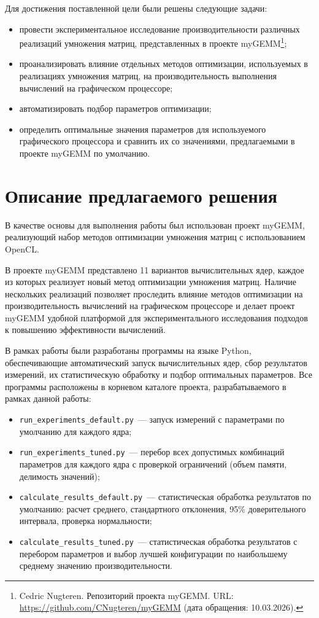 \documentclass[a4paper]{article}
\begin{document}
Для достижения поставленной цели были решены следующие задачи:
\begin{itemize}
\item провести экспериментальное исследование производительности различных реализаций умножения матриц, представленных в проекте myGEMM\footnote{Cedric Nugteren. Репозиторий проекта myGEMM. URL: \url{https://github.com/CNugteren/myGEMM} (дата обращения: 10.03.2026).};
\item проанализировать влияние отдельных методов оптимизации, используемых в реализациях умножения матриц, на производительность выполнения вычислений на графическом процессоре;
\item автоматизировать подбор параметров оптимизации;
\item определить оптимальные значения параметров для используемого графического процессора и сравнить их со значениями, предлагаемыми в проекте myGEMM по умолчанию.
\end{itemize}

\section{Описание предлагаемого решения}

В качестве основы для выполнения работы был использован проект myGEMM, реализующий набор методов оптимизации умножения матриц с использованием OpenCL.

В проекте myGEMM представлено 11 вариантов вычислительных ядер, каждое из которых реализует новый метод оптимизации умножения матриц. Наличие нескольких реализаций позволяет проследить влияние методов оптимизации на производительность вычислений на графическом процессоре и делает проект myGEMM удобной платформой для экспериментального исследования подходов к повышению эффективности вычислений.

В рамках работы были разработаны программы на языке Python, обеспечивающие автоматический запуск вычислительных ядер, сбор результатов измерений, их статистическую обработку и подбор оптимальных параметров. Все программы расположены в корневом каталоге проекта, разрабатываемого в рамках данной работы:

\begin{itemize}
\item \texttt{run\_experiments\_default.py}~--- запуск измерений с параметрами по умолчанию для каждого ядра;
\item \texttt{run\_experiments\_tuned.py}~--- перебор всех допустимых комбинаций параметров для каждого ядра с проверкой ограничений (объем памяти, делимость значений);
\item \texttt{calculate\_results\_default.py}~--- статистическая обработка результатов по умолчанию: расчет среднего, стандартного отклонения, 95\% доверительного интервала, проверка нормальности;
\item \texttt{calculate\_results\_tuned.py}~--- статистическая обработка результатов с перебором параметров и выбор лучшей конфигурации по наибольшему среднему значению производительности.
\end{itemize}
\end{document}
